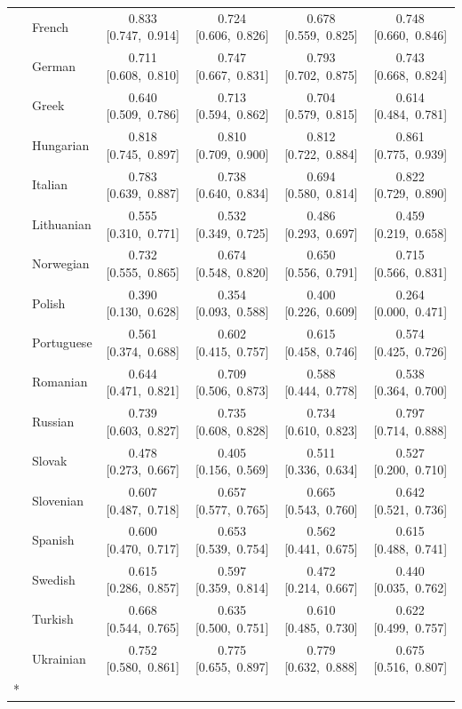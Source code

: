 \begin{longtable}[t]{llcccc}
 & French & 0.833 [0.747,~0.914] & 0.724 [0.606,~0.826] & 0.678 [0.559,~0.825] & 0.748 [0.660,~0.846]\\

 & German & 0.711 [0.608,~0.810] & 0.747 [0.667,~0.831] & 0.793 [0.702,~0.875] & 0.743 [0.668,~0.824]\\

 & Greek & 0.640 [0.509,~0.786] & 0.713 [0.594,~0.862] & 0.704 [0.579,~0.815] & 0.614 [0.484,~0.781]\\

 & Hungarian & 0.818 [0.745,~0.897] & 0.810 [0.709,~0.900] & 0.812 [0.722,~0.884] & 0.861 [0.775,~0.939]\\

 & Italian & 0.783 [0.639,~0.887] & 0.738 [0.640,~0.834] & 0.694 [0.580,~0.814] & 0.822 [0.729,~0.890]\\

 & Lithuanian & 0.555 [0.310,~0.771] & 0.532 [0.349,~0.725] & 0.486 [0.293,~0.697] & 0.459 [0.219,~0.658]\\

 & Norwegian & 0.732 [0.555,~0.865] & 0.674 [0.548,~0.820] & 0.650 [0.556,~0.791] & 0.715 [0.566,~0.831]\\

 & Polish & 0.390 [0.130,~0.628] & 0.354 [0.093,~0.588] & 0.400 [0.226,~0.609] & 0.264 [0.000,~0.471]\\

 & Portuguese & 0.561 [0.374,~0.688] & 0.602 [0.415,~0.757] & 0.615 [0.458,~0.746] & 0.574 [0.425,~0.726]\\

 & Romanian & 0.644 [0.471,~0.821] & 0.709 [0.506,~0.873] & 0.588 [0.444,~0.778] & 0.538 [0.364,~0.700]\\

 & Russian & 0.739 [0.603,~0.827] & 0.735 [0.608,~0.828] & 0.734 [0.610,~0.823] & 0.797 [0.714,~0.888]\\

 & Slovak & 0.478 [0.273,~0.667] & 0.405 [0.156,~0.569] & 0.511 [0.336,~0.634] & 0.527 [0.200,~0.710]\\

 & Slovenian & 0.607 [0.487,~0.718] & 0.657 [0.577,~0.765] & 0.665 [0.543,~0.760] & 0.642 [0.521,~0.736]\\

 & Spanish & 0.600 [0.470,~0.717] & 0.653 [0.539,~0.754] & 0.562 [0.441,~0.675] & 0.615 [0.488,~0.741]\\

 & Swedish & 0.615 [0.286,~0.857] & 0.597 [0.359,~0.814] & 0.472 [0.214,~0.667] & 0.440 [0.035,~0.762]\\

 & Turkish & 0.668 [0.544,~0.765] & 0.635 [0.500,~0.751] & 0.610 [0.485,~0.730] & 0.622 [0.499,~0.757]\\

 & Ukrainian & 0.752 [0.580,~0.861] & 0.775 [0.655,~0.897] & 0.779 [0.632,~0.888] & 0.675 [0.516,~0.807]\\*
\end{longtable}
\endgroup{}
\endgroup{}
